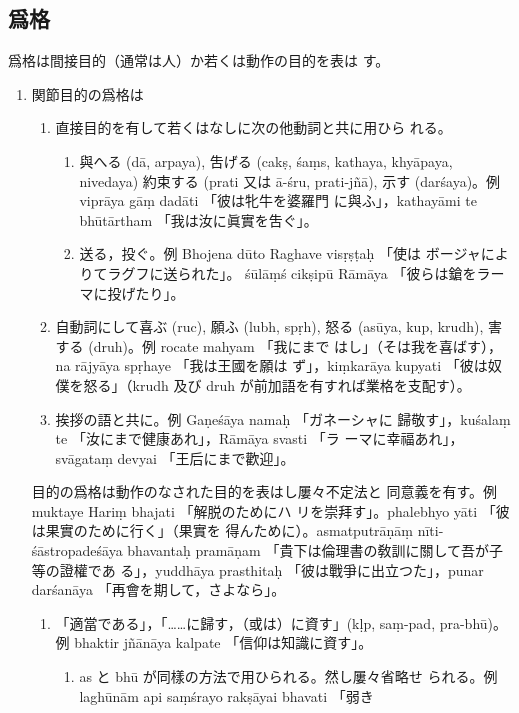 \subsection{爲格}
\numberParagraph
爲格は間接目的（通常は人）か若くは動作の目的を表は
す。
\begin{enumerate}[label=(\Alph*)]
\item 関節目的の爲格は
\begin{enumerate}[label=(\arabic*)]
\item 直接目的を有して若くはなしに次の他動詞と共に用ひら
れる。
\begin{enumerate}[label=(\alph*)]
\item 與へる (dā, arpaya), 吿げる (cakṣ, śaṃs, kathaya,
khyāpaya, nivedaya) 約束する (prati 又は ā-śru, prati-jñā),
示す (darśaya)。例 viprāya gāṃ dadāti 「彼は牝牛を婆羅門
に與ふ」，kathayāmi te bhūtārtham 「我は汝に眞實を吿ぐ」。
\item 送る，投ぐ。例 Bhojena dūto Raghave visṛṣṭaḥ 「使は
ボージャによりてラグフに送られた」。 śūlāṃś cikṣipū Rāmāya
「彼らは鎗をラーマに投げたり」。
\end{enumerate}
\item 自動詞にして喜ぶ (ruc), 願ふ (lubh, spṛh), 怒る (asūya,
kup, krudh), 害する (druh)。例 rocate mahyam 「我にまで
はし」（そは我を喜ばす），na rājyāya spṛhaye 「我は王國を願は
ず」，kiṃkarāya kupyati 「彼は奴僕を怒る」（krudh 及び druh
が前加語を有すれば業格を支配す）。
\item 挨拶の語と共に。例 Gaṇeśāya namaḥ 「ガネーシャに
歸敬す」，kuśalaṃ te 「汝にまで健康あれ」，Rāmāya svasti 「ラ
ーマに幸福あれ」，svāgataṃ devyai 「王后にまで歡迎」。
\end{enumerate}
目的の爲格は動作のなされた目的を表はし屢々不定法と
同意義を有す。例 muktaye Hariṃ bhajati 「解脱のためにハ
リを崇拜す」。phalebhyo yāti 「彼は果實のために行く」（果實を
得んために）。asmatputrāṇāṃ nīti-śāstropadeśāya bhavantaḥ
pramāṇam 「貴下は倫理書の敎訓に關して吾が子等の證權であ
る」，yuddhāya prasthitaḥ 「彼は戰爭に出立つた」，punar
darśanāya 「再會を期して，さよなら」。
\begin{enumerate}[label=(\arabic*)]
\item 「適當である」，「……に歸す，（或は）に資す」(kḷp, saṃ-pad,
pra-bhū)。例 bhaktir jñānāya kalpate 「信仰は知識に資す」。
\begin{enumerate}[label=(\alph*)]
\item as と bhū が同樣の方法で用ひられる。然し屢々省略せ
られる。例 laghūnām api saṃśrayo rakṣāyai bhavati 「弱き

\end{enumerate}
\end{enumerate}
\end{enumerate}
